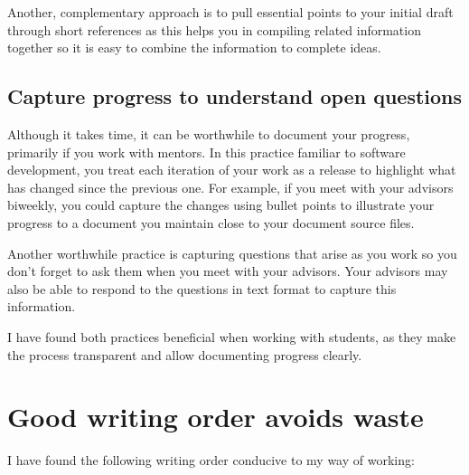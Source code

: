 Another, complementary approach is to pull essential points to your initial draft through short references as this helps you in compiling related information together so it is easy to combine the information to complete ideas.

\subsection{Capture progress to understand open questions}

Although it takes time, it can be worthwhile to document your progress, primarily if you work with mentors. In this practice familiar to software development, you treat each iteration of your work as a release to highlight what has changed since the previous one.
For example, if you meet with your advisors biweekly, you could capture the changes using bullet points to illustrate your progress to a document you maintain close to your document source files.

Another worthwhile practice is capturing questions that arise as you work so you don't forget to ask them when you meet with your advisors.
Your advisors may also be able to respond to the questions in text format to capture this information.

I have found both practices beneficial when working with students, as they make the process transparent and allow documenting progress clearly.

\section{Good writing order avoids waste}

I have found the following writing order conducive to my way of working:

